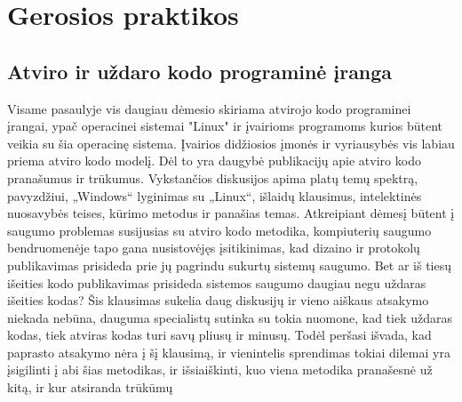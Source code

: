 \documentclass[a4paper,12pt,fleqn]{article}
\begin{document}
\newpage
\section{Gerosios praktikos}
\label{sec:motivation}

\subsection{Atviro ir uždaro kodo programinė įranga}
\label{sec:example}

Visame pasaulyje vis daugiau dėmesio skiriama atvirojo kodo programinei įrangai, ypač operacinei sistemai "Linux" ir įvairioms programoms kurios būtent veikia su šia operacinę sistema. Įvairios didžiosios įmonės ir vyriausybės vis labiau priema atviro kodo modelį. Dėl to yra daugybė publikacijų apie atviro kodo pranašumus ir trūkumus. Vykstančios diskusijos apima platų temų spektrą, pavyzdžiui, „Windows“ lyginimas su „Linux“, išlaidų klausimus, intelektinės nuosavybės teises, kūrimo metodus ir panašias temas. Atkreipiant dėmesį būtent į saugumo problemas susijusias su atviro kodo metodika, kompiuterių saugumo bendruomenėje tapo gana nusistovėjęs įsitikinimas, kad dizaino ir protokolų publikavimas prisideda prie jų pagrindu sukurtų sistemų saugumo. \cite{HoepmanJaap} Bet ar iš tiesų išeities kodo publikavimas prisideda sistemos saugumo daugiau negu uždaras išeities kodas? Šis klausimas sukelia daug diskusijų ir vieno aiškaus atsakymo niekada nebūna, dauguma specialistų sutinka su tokia nuomone, kad tiek uždaras kodas, tiek atviras kodas turi savų pliusų ir minusų. Todėl peršasi išvada, kad paprasto atsakymo nėra į šį klausimą, ir vienintelis sprendimas tokiai dilemai yra įsigilinti į abi šias metodikas, ir išsiaiškinti, kuo viena metodika pranašesnė už kitą, ir kur atsiranda trūkūmų
\end{document}

